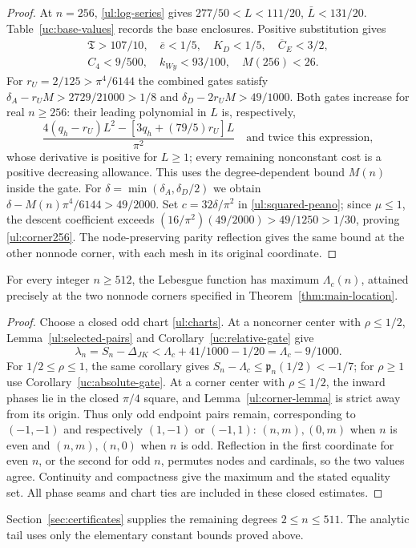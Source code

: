 \begin{proof}
At $n=256$, \eqref{ul:log-series} gives $277/50<L<111/20$,
$\bar{L}<131/20$. Table~\ref{uc:base-values} records the base enclosures.
Positive substitution gives
\begin{gather*}
 \mathfrak{T}>107/10,\quad\bar e<1/5,\quad K_D<1/5,\quad
 \overline C_E<3/2,\\ C_4<9/500,\quad
 k_{Wy}<93/100,\quad M(256)<26.
\end{gather*}
For $r_U=2/125>\pi^4/6144$ the combined gates satisfy
$\delta_A-r_UM>2729/21000>1/8$ and
$\delta_D-2r_UM>49/1000$.
Both gates increase for real $n\geq256$: their leading polynomial
in $L$ is, respectively,
\[
 \frac{4(q_h-r_U)L^2-[3q_h+(79/5)r_U]L}{\pi^2}
 \quad\text{and twice this expression},
\]
whose derivative is positive for $L\geq1$; every remaining
nonconstant cost is a positive decreasing allowance.  This uses the
degree-dependent bound $M(n)$ inside the gate.
For $\delta=\min(\delta_A,\delta_D/2)$ we obtain
$\delta-M(n)\pi^4/6144>49/2000$.
Set $c=32\delta/\pi^2$ in \eqref{ul:squared-peano}; since $\mu\leq1$,
the descent coefficient exceeds
$(16/\pi^2)(49/2000)>49/1250>1/30$, proving \eqref{ul:corner256}.
The node-preserving parity reflection gives the same bound at the other
nonnode corner, with each mesh in its original coordinate.
\end{proof}

\begin{theorem}\label{ul:tail-location}
For every integer $n\geq512$, the Lebesgue function has maximum
$\Lambda_c(n)$, attained precisely at the two nonnode corners specified
in Theorem~\ref{thm:main-location}.
\end{theorem}
\begin{proof}
Choose a closed odd chart \eqref{ul:charts}. At a noncorner center
with $\rho\leq1/2$, Lemma~\ref{ul:selected-pairs} and
Corollary~\ref{uc:relative-gate} give
\[
 \lambda_n=S_n-\Delta_{JK}
       <\Lambda_c+41/1000-1/20=\Lambda_c-9/1000.
\]
For $1/2\leq\rho\leq1$, the same corollary gives
$S_n-\Lambda_c\leq \mathfrak p_n(1/2)<-1/7$; for $\rho\geq1$ use
Corollary~\ref{uc:absolute-gate}. At a corner center with
$\rho\leq1/2$, the inward phases lie in the closed $\pi/4$ square,
and Lemma~\ref{ul:corner-lemma} is strict away from its origin.
Thus only odd endpoint pairs remain, corresponding to $(-1,-1)$
and respectively $(1,-1)$ or $(-1,1)$: $(n,m),(0,m)$ when $n$ is
even and $(n,m),(n,0)$ when $n$ is odd. Reflection in the first
coordinate for even $n$, or the second for odd $n$, permutes nodes and
cardinals, so the two values agree. Continuity and compactness give
the maximum and the stated equality set. All phase seams and chart
ties are included in these closed estimates.
\end{proof}

Section~\ref{sec:certificates} supplies the remaining degrees
$2\leq n\leq511$. The analytic tail uses only the elementary
constant bounds proved above.
